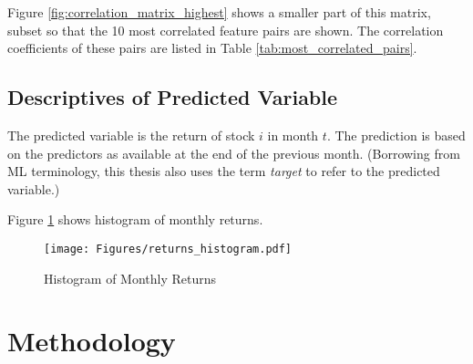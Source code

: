 		 Figure \ref{fig:correlation_matrix_highest} shows a smaller part of this matrix, subset so that the 10 most correlated feature pairs are shown. The correlation coefficients of these pairs are listed in Table \ref{tab:most_correlated_pairs}.
		 
		
		
		
	\subsection{Descriptives of Predicted Variable}
		The predicted variable is the return of stock $i$ in month $t$. The prediction is based on the predictors as available at the end of the previous month. (Borrowing from ML terminology, this thesis also uses the term \textit{target} to refer to the predicted variable.) 
		
		Figure \ref{fig:returns_histogram} shows histogram of monthly returns. 
			
		\begin{center}
			\begin{figure}
				\texttt{[image: Figures/returns\_histogram.pdf]}
				\caption{Histogram of Monthly Returns}
				\label{fig:returns_histogram}
			\end{figure}
		\end{center}


\section{Methodology}

